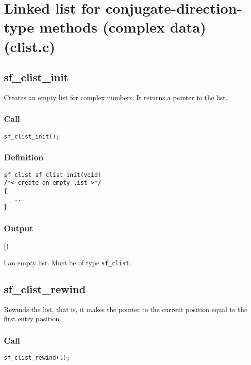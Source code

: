 \section[Linked list for CD-type methods (complex data) (clist.c)]{Linked list for conjugate-direction-type methods (complex data) (clist.c)}




\subsection{{sf\_clist\_init}}
Creates an empty list for complex numbers. It returns a pointer to the list.

\subsubsection*{Call}
\begin{verbatim}sf_clist_init();\end{verbatim}

\subsubsection*{Definition}
\begin{verbatim}
sf_clist sf_clist_init(void)
/*< create an empty list >*/
{
   ...
}
\end{verbatim}

\subsubsection*{Output}
\begin{desclist}{\tt }{\quad}[\tt ]
   \setlength\itemsep{0pt}
   \item[l] an empty list. Must be of type \texttt{sf\_clist}.  
\end{desclist}




\subsection{{sf\_clist\_rewind}}
Rewinds the list, that is, it makes the pointer to the current position equal to the first entry position.

\subsubsection*{Call}
\begin{verbatim}sf_clist_rewind(l);\end{verbatim}

